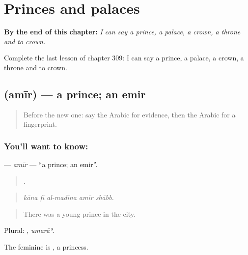 
\chapter{Princes and palaces}
\label{ch:ar-princes-and-palaces}

\begin{chapteropening}
\textbf{By the end of this chapter:} \emph{I can say a prince, a palace, a crown, a throne and to crown.}

Complete the last lesson of chapter 309: I can say a prince, a palace, a crown, a throne and to crown.
\end{chapteropening}

\section[\texorpdfstring{\ar{أمير} (amīr)}{أمير (amīr)}]{ (amīr) — a prince; an emir}

\label{lesson:AR-C309-amir}



\begin{quote}
Before the new one: say the Arabic for evidence, then the Arabic for a fingerprint.
\end{quote}

\subsection*{You'll want to know: }
\textbf{} — \emph{amīr} — \textquotedblleft{}a prince; an emir\textquotedblright{}.

\begin{quote}
    .
\end{quote}

\begin{quote}
\emph{kāna fī al-madīna amīr shābb.}
\end{quote}

\begin{quote}
There was a young prince in the city.
\end{quote}

Plural: , \emph{umarāʾ}.

The feminine is , a princess.

